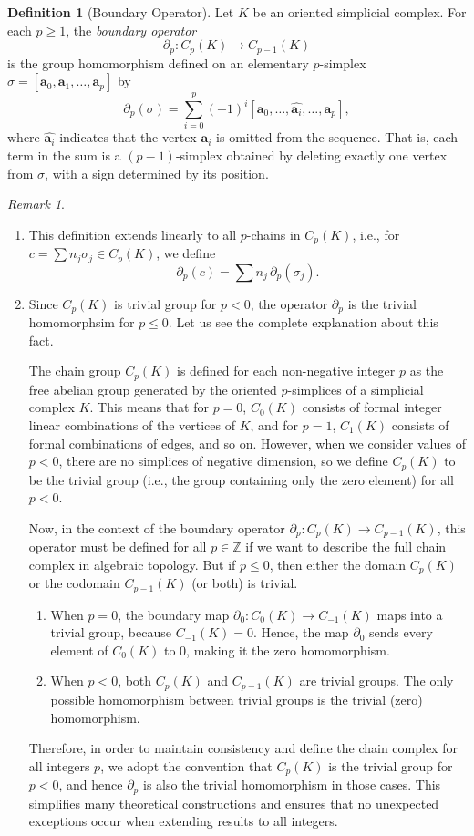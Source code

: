 \documentclass[12pt,oneside,reqno]{amsart}
\theoremstyle{plain}
\theoremstyle{definition}
\newtheorem{definition}[theorem]{Definition}
\theoremstyle{remark}
\newtheorem{remark}[theorem]{Remark}
\newcommand{\0}{{\textbf{0}}}
\begin{document}
\begin{definition}[Boundary Operator]
Let $K$ be an oriented simplicial complex. For each $p \geq 1$, the \emph{boundary operator}
\[
\partial_p : C_p(K) \to C_{p-1}(K)
\]
is the group homomorphism defined on an elementary $p$-simplex $\sigma = [\mathbf{a}_0, \mathbf{a}_1, \dots, \mathbf{a}_p]$ by
\[
\partial_p(\sigma) = \sum_{i=0}^{p} (-1)^i [\mathbf{a}_0, \dots, \widehat{\mathbf{a}_i}, \dots, \mathbf{a}_p],
\]
where $\widehat{\mathbf{a}_i}$ indicates that the vertex $\mathbf{a}_i$ is omitted from the sequence. That is, each term in the sum is a $(p-1)$-simplex obtained by deleting exactly one vertex from $\sigma$, with a sign determined by its position.
\end{definition}
\begin{remark}\hfill
\begin{enumerate}
\item This definition extends linearly to all $p$-chains in $C_p(K)$, i.e., for $c = \sum n_j \sigma_j \in C_p(K)$, we define
\[
\partial_p(c) = \sum n_j \, \partial_p(\sigma_j).
\]    
\item Since $C_{p}(K)$ is trivial group for $p < 0$, the operator $\partial_p$ is the trivial homomorphsim for $p \leq 0$. Let us see the complete explanation about this fact.

The chain group $C_p(K)$ is defined for each non-negative integer $p$ as the free abelian group generated by the oriented $p$-simplices of a simplicial complex $K$. This means that for $p = 0$, $C_0(K)$ consists of formal integer linear combinations of the vertices of $K$, and for $p = 1$, $C_1(K)$ consists of formal combinations of edges, and so on. However, when we consider values of $p < 0$, there are no simplices of negative dimension, so we define $C_p(K)$ to be the trivial group (i.e., the group containing only the zero element) for all $p < 0$.

Now, in the context of the boundary operator $\partial_p : C_p(K) \to C_{p-1}(K)$, this operator must be defined for all $p \in \mathbb{Z}$ if we want to describe the full chain complex in algebraic topology. But if $p \leq 0$, then either the domain $C_p(K)$ or the codomain $C_{p-1}(K)$ (or both) is trivial.

\begin{enumerate}
    \item When $p = 0$, the boundary map $\partial_0 : C_0(K) \to C_{-1}(K)$ maps into a trivial group, because $C_{-1}(K) = {0}$. Hence, the map $\partial_0$ sends every element of $C_0(K)$ to $0$, making it the zero homomorphism.
    \item When $p < 0$, both $C_p(K)$ and $C_{p-1}(K)$ are trivial groups. The only possible homomorphism between trivial groups is the trivial (zero) homomorphism.
\end{enumerate}
Therefore, in order to maintain consistency and define the chain complex for all integers $p$, we adopt the convention that $C_p(K)$ is the trivial group for $p < 0$, and hence $\partial_p$ is also the trivial homomorphism in those cases. This simplifies many theoretical constructions and ensures that no unexpected exceptions occur when extending results to all integers.
\end{enumerate}


\end{remark}
\end{document}
